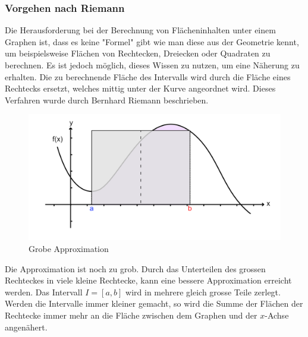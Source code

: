 \documentclass{fhnwreport} %
\begin{document}
\subsubsection{Vorgehen nach Riemann}
Die Herausforderung bei der Berechnung von Flächeninhalten unter einem Graphen ist, dass es keine "Formel" gibt wie man diese aus der Geometrie kennt, um beispielsweise Flächen von Rechtecken, Dreiecken oder Quadraten zu berechnen. Es ist jedoch möglich, dieses Wissen zu nutzen, um eine Näherung zu erhalten. Die zu berechnende Fläche des Intervalls wird durch die Fläche eines Rechtecks ersetzt, welches mittig unter der Kurve angeordnet wird. Dieses Verfahren wurde durch Bernhard Riemann \cite{Riemann2020} beschrieben.
\begin{figure}[!h]
\centering
\includegraphics{grobe-approximierung-riemann.png}
\caption{Grobe Approximation}
\label{fig:grobe_approximation}
\end{figure}

\pagebreak
Die Approximation ist noch zu grob. Durch das Unterteilen des grossen Rechteckes in viele kleine Rechtecke, kann eine bessere Approximation erreicht werden. Das Intervall $I = [a,b]$ wird in mehrere gleich grosse Teile zerlegt. Werden die Intervalle immer kleiner gemacht, so wird die Summe der Flächen der Rechtecke immer mehr an die Fläche zwischen dem Graphen und der $x$-Achse angenähert.
\end{document}
